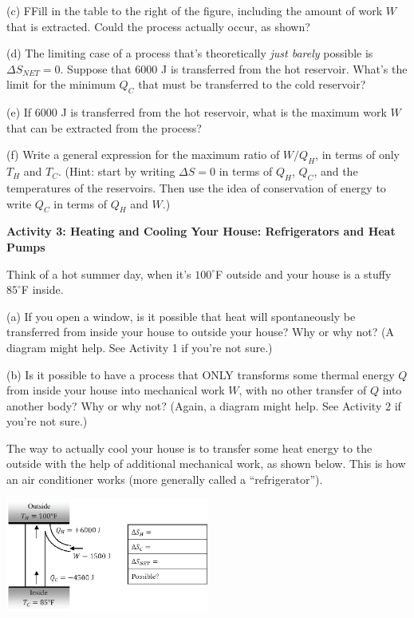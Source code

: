 (c) FFill in the table to the right of the figure, including the amount of work $W$ that is extracted.  Could the process actually occur, as shown?
\answerspace{0.2 in}

(d) The limiting case of a process that's theoretically \textit{just barely} possible is $\Delta S_{NET} = 0$.  Suppose that 6000 J is transferred from the hot reservoir.  What's the limit for the minimum $Q_C$ that must be transferred to the cold reservoir?
\answerspace{0.4 in}

(e) If  6000 J is transferred from the hot reservoir, what is the maximum work $W$ that can be extracted from the process?
\answerspace{0.4 in}

\pagebreak[2]
(f) Write a general expression for the maximum ratio of $W/Q_H$, in terms of only $T_H$ and $T_C$.  (Hint: start by writing $\Delta S = 0$ in terms of $Q_H$, $Q_C$, and the temperatures of the reservoirs.  Then use the idea of conservation of energy to write $Q_C$ in terms of $Q_H$ and $W$.)
\answerspace{1.5 in}

\textbf{Activity 3: Heating and Cooling Your House: Refrigerators and Heat Pumps}

Think of a hot summer day, when it's $100^\circ$F outside and your house is a stuffy $85^\circ$F inside.  

(a) If you open a window, is it possible that heat will spontaneously be transferred from inside your house to outside your house?  Why or why not?  (A diagram might help.  See Activity 1 if you're not sure.)
\answerspace{1.2 in}

(b) Is it possible to have a process that ONLY transforms some thermal energy $Q$ from inside your house into mechanical work $W$, with no other transfer of $Q$ into another body?  Why or why not?  (Again, a diagram might help.  See Activity 2 if you're not sure.)
\answerspace{1.2 in}

The way to actually cool your house is to transfer some heat energy to the outside with the help of additional mechanical work, as shown below.  This is how an air conditioner works (more generally called a ``refrigerator'').

\begin{center}
\vspace{-0.3 in}
\includegraphics[width=0.5\textwidth]{entropy_is_it_possible/fig6.eps}
\vspace{-0.4 in}
\end{center}

